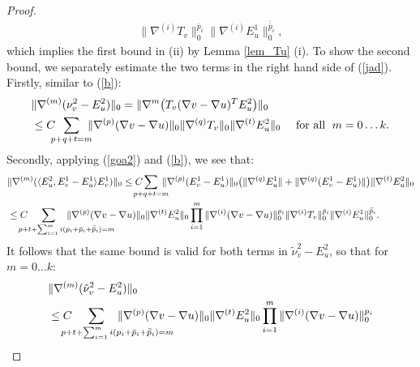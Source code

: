 \documentclass[reqno,twoside,11pt]{amsart}
\newcommand*{\dbar}[1]{\bar{\bar{#1}}}
\numberwithin{equation}{section}
\theoremstyle{plain}
\theoremstyle{definition}
\begin{document}
\begin{proof}
\begin{equation}
\begin{split}
\|\nabla^{(i)}T_v\|_0^{\bar p_i} \|\nabla^{(i)}E_u^1\|_0^{\dbar p_i},
\end{split}
\end{equation}
which implies the first bound in (ii) by Lemma \ref{lem_Tu} (i).
To show the second bound, we separately estimate the two terms
in the right hand side of (\ref{jad}). Firstly, similar to (\ref{b}):
\begin{equation*}
\begin{split}
&\|\nabla^{(m)}(\nu_v^2-E_u^2)\|_0 = \|\nabla^{m}\big(T_v(\nabla v-\nabla u)^TE_u^2\big)\|_0
\\ & \leq C\hspace{-2mm}\sum_{p+q+t=m}\hspace{-2mm} \|\nabla^{(p)}(\nabla v-\nabla u)\|_0
\|\nabla^{(q)}T_v\|_0\|\nabla^{(t)}E^2_u\|_0 \quad\mbox{ for all }\; m=0\ldots k.
\end{split}
\end{equation*}
Secondly, applying (\ref{goa2}) and (\ref{b}), we see that:
\begin{equation*}
\begin{split}
&\|\nabla^{(m)}(\langle E^2_u,E^1_v-E^1_u\rangle E^1_v)\|_0
\leq C\hspace{-4mm}\sum_{p+q+t=m}\hspace{-3mm} \|\nabla^{(p)}(E^1_v-E^1_u)\|_0
\big(\|\nabla^{(q)}E^1_u\|+\|\nabla^{(q)}(E^1_v-E^1_u)\|\big)\|\nabla^{(t)}E^2_u\|_0
\\ & \leq C \hspace{-4mm}
\sum_{p+t+\sum_{i=1}^mi(p_i+\bar p_i+\dbar p_i)=m\hspace{-13mm}}\hspace{-5mm}
\|\nabla^{(p)}(\nabla v -\nabla u)\|_0
\|\nabla^{(t)}E_u^2\|_0\prod_{i=1}^m \|\nabla^{(i)}(\nabla v-\nabla u)\|_0^{p_i}
\|\nabla^{(i)}T_v\|_0^{\bar p_i} \|\nabla^{(i)}E_u^1\|_0^{\dbar p_i}.
\end{split}
\end{equation*}
It follows that the same bound is valid for both terms in
$\tilde\nu_v^2-E_u^2$, so that for  $m=0\ldots k$:
\begin{equation*}
\begin{split}
&\|\nabla^{(m)}(\tilde\nu_v^2-E_u^2)\|_0
\\ & \leq C \hspace{-4mm}
\sum_{p+t+\sum_{i=1}^mi(p_i+\bar p_i+\dbar p_i)=m\hspace{-13mm}}\hspace{-5mm}
\|\nabla^{(p)}(\nabla v -\nabla u)\|_0
\|\nabla^{(t)}E_u^2\|_0\prod_{i=1}^m \|\nabla^{(i)}(\nabla v-\nabla u)\|_0^{p_i}

\end{split}
\end{equation*}
\end{proof}
\end{document}
